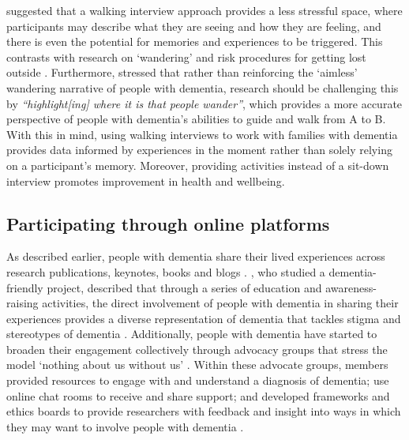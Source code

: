  \cite{kullberg2017walking}  suggested that a walking interview approach provides a less stressful space, where participants may describe what they are seeing and how they are feeling, and there is even the potential for memories and experiences to be triggered. This contrasts with research on `wandering' and risk procedures for getting lost outside \citep{odzakovic2020verjoyed}. Furthermore, \cite{brittain2017walking} stressed that rather than reinforcing the `aimless' wandering narrative of people with dementia, research should be challenging this by \textit{``highlight[ing] where it is that people wander''}, which provides a more accurate perspective of people with dementia's abilities to guide and walk from A to B. With this in mind, using walking interviews to work with families with dementia provides data informed by experiences in the moment rather than solely relying on a participant's memory. Moreover, providing activities instead of a sit-down interview promotes improvement in health and wellbeing. 

\subsection{Participating through online platforms}
\label{PD:onlinePlatform}
As described earlier, people with dementia share their lived experiences across research publications, keynotes, books and blogs \citep{bryden_challenging_2020, shakespeare_rights_2019}. \cite{phillipson2019involvement}, who studied a dementia-friendly project, described that through a series of education and awareness-raising activities, the direct involvement of people with dementia in sharing their experiences provides a diverse representation of dementia that tackles stigma and stereotypes of dementia \citep{herrmann_systematic_2018}. Additionally, people with dementia have started to broaden their engagement collectively through advocacy groups that stress the model `nothing about us without us' \citep{oldfield2021nothing}. Within these advocate groups, members provided resources to engage with and understand a diagnosis of dementia; use online chat rooms to receive and share support; and developed frameworks and ethics boards to provide researchers with feedback and insight into ways in which they may want to involve people with dementia \citep{davies2021dementia}.

